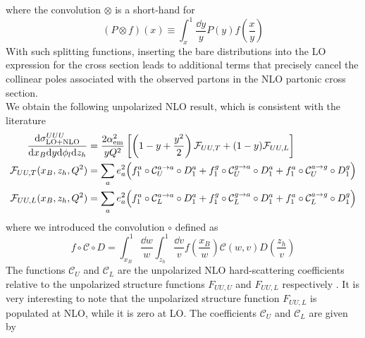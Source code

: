where the convolution $\otimes$ is a short-hand for
\begin{equation}
    (P\otimes f )(x)\equiv\int_x^1\frac{\dd y}{y} P(y) f\left(\frac{x}{y}\right)
\end{equation}
With such splitting functions, inserting the bare distributions into the LO expression for the cross section leads to additional terms that precisely cancel the collinear poles associated with the observed partons in the NLO partonic cross section. \\
We obtain the following unpolarized NLO result, which is consistent with the literature \cite{de_Florian_1998}
\begin{equation}
    \begin{aligned}
        \frac{\dd \sigma^{UUU}_{\rm LO+NLO}}{\dd x_B \dd y \dd \phi_l \dd z_h}&=\frac{2 \alpha_{\rm em}^2}{y  Q^2}\left[ \left(1-y+\frac{y^2}{2}\right)\mathcal{F}_{UU,T} +(1-y)\mathcal{F}_{UU,L}\right]\\
        \mathcal{F}_{UU,T}(x_B,z_h,Q^2)&= \sum_a e_a^2 \Big(f_1^a \circ \mathcal{C}_U^{a \to a} \circ D_1^a +f_1^g \circ \mathcal{C}_{U}^{g \to a} \circ D_1^a+f_1^a \circ \mathcal{C}_U^{a \to g} \circ D_1^g \Big)\\
        \mathcal{F}_{UU,L}(x_B,z_h,Q^2)&=\sum_a e_a^2 \Big(f_1^a \circ \mathcal{C}_L^{a \to a} \circ D_1^a  +f_1^g \circ \mathcal{C}_L^{g \to a} \circ D_1^a+f_1^a \circ \mathcal{C}_L^{a \to g} \circ D_1^g \Big)
    \end{aligned}
\end{equation}
where we introduced the convolution $\circ$ defined as
\begin{equation}
    f \circ \mathcal{C} \circ D = \int_{x_B}^1 \frac{\dd w}{w}\int_{z_h}^1 \frac{\dd v}{v} f\left(\frac{x_B}{w}\right) \mathcal{C}\left(w,v\right) D\left(\frac{z_h}{v}\right)
\end{equation}
The functions $\mathcal{C}_U$ and $\mathcal{C}_L$ are the unpolarized NLO hard-scattering coefficients relative to the unpolarized structure functions $F_{UU,U}$ and $F_{UU,L}$ respectively \cite{bacchetta_semi-inclusive_2007}. It is very interesting to note that the unpolarized structure function $F_{UU,L}$ is populated at NLO, while it is zero at LO. The coefficients $\mathcal{C}_U$ and $\mathcal{C}_L$ are given by
